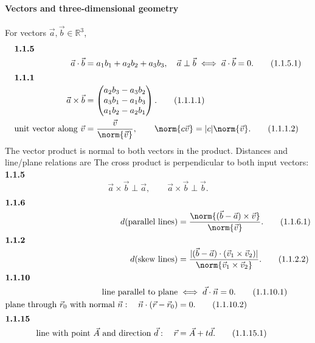 \paragraph*{Vectors and three-dimensional geometry}
For vectors $\vec a,\vec b\in\mathbb R^3$,
\begin{align}\intertext{\textbf{1.1.5}}
\vec a\cdot\vec b&=a_1b_1+a_2b_2+a_3b_3,\quad \vec a\perp\vec b\iff \vec a\cdot\vec b=0. \tag{1.1.5.1}\\
\intertext{\textbf{1.1.1}}
\vec a\times\vec b&=\begin{pmatrix}a_2b_3-a_3b_2\\a_3b_1-a_1b_3\\a_1b_2-a_2b_1\end{pmatrix}. \tag{1.1.1.1}\label{eq:cross-product}\\
\text{unit vector along }\vec v&=\frac{\vec v}{\norm{\vec v}},\qquad \norm{c\vec v}=|c|\norm{\vec v}. \tag{1.1.1.2}
\end{align}
The vector product is normal to both vectors in the product. Distances and line/plane relations are
The cross product is perpendicular to both input vectors:
\noindent\textbf{1.1.5}\quad
\begin{equation}
\vec a\times\vec b\perp\vec a,\qquad \vec a\times\vec b\perp\vec b.\tag{1.1.5.2}\label{eq:cross-perpendicular}
\end{equation}
\begin{align}\intertext{\textbf{1.1.6}}
d(\text{parallel lines})&=\frac{\norm{(\vec b-\vec a)\times\vec v}}{\norm{\vec v}}. \tag{1.1.6.1}\label{eq:parallel-distance}\\
\intertext{\textbf{1.1.2}}
d(\text{skew lines})&=\frac{|(\vec b-\vec a)\cdot(\vec v_1\times\vec v_2)|}{\norm{\vec v_1\times\vec v_2}}. \tag{1.1.2.2}\\
\intertext{\textbf{1.1.10}}
\text{line parallel to plane}&\iff \vec d\cdot\vec n=0. \tag{1.1.10.1}\label{eq:line-plane-parallel}\\
\text{plane through }\vec r_0\text{ with normal }\vec n:\quad \vec n\cdot(\vec r-\vec r_0)&=0. \tag{1.1.10.2}\label{eq:plane-normal}\\
\intertext{\textbf{1.1.15}}
\text{line with point }\vec A\text{ and direction }\vec d:\quad \vec r&=\vec A+t\vec d. \tag{1.1.15.1}\label{eq:line-point-direction}
\end{align}

